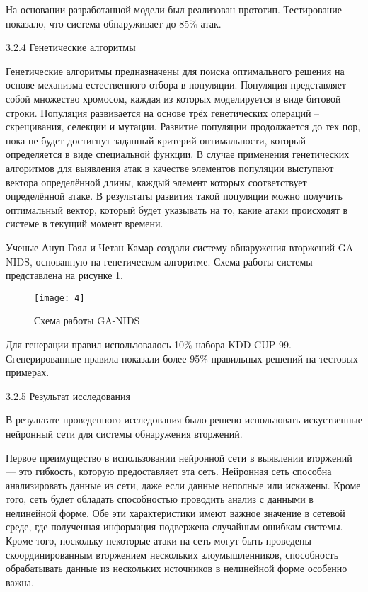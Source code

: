 На основании разработанной модели был реализован прототип. Тестирование показало, что система обнаруживает до 85\% атак.\par 

3.2.4  Генетические алгоритмы\par 

Генетические алгоритмы предназначены для поиска оптимального решения на основе механизма естественного отбора в популяции. Популяция представляет собой множество хромосом, каждая из которых моделируется в виде битовой строки. Популяция развивается на основе трёх генетических операций – скрещивания, селекции и мутации. Развитие популяции продолжается до тех пор, пока не будет достигнут заданный критерий оптимальности, который определяется в виде специальной функции. В случае применения генетических алгоритмов для выявления атак в качестве элементов популяции выступают вектора определённой длины, каждый элемент которых соответствует определённой атаке. В результаты развития такой популяции можно получить оптимальный вектор, который будет указывать на то, какие атаки происходят в системе в текущий момент времени.\par 

Ученые Ануп Гоял и Четан Камар создали систему обнаружения вторжений GA-NIDS, основанную на генетическом алгоритме. Схема работы системы представлена на рисунке \ref{img:4}.

\clearpage

\begin{figure}[h!]
    \centering
    \texttt{[image: 4]}
    \caption{Схема работы GA-NIDS}
    \label{img:4}
\end{figure} 

Для генерации правил использовалось 10\% набора KDD CUP 99. Сгенерированные правила показали более 95\% правильных решений на тестовых примерах.\par

3.2.5  Результат исследования\par 

В результате проведенного исследования было решено использовать искуственные нейронный сети для системы обнаружения вторжений. \par 

Первое преимущество в использовании нейронной сети в выявлении вторжений --- это гибкость, которую предоставляет эта сеть. Нейронная сеть способна анализировать данные из сети, даже если данные неполные или искажены. Кроме того, сеть будет обладать способностью проводить анализ с данными в нелинейной форме. Обе эти характеристики имеют важное значение в сетевой среде, где полученная информация подвержена случайным ошибкам системы. Кроме того, поскольку некоторые атаки на сеть могут быть проведены скоординированным вторжением нескольких злоумышленников, способность обрабатывать данные из нескольких источников в нелинейной форме особенно важна.\par 

